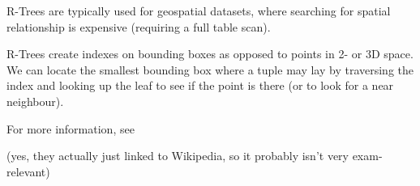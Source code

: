 R-Trees are typically used for geospatial datasets, where searching for spatial relationship is expensive (requiring a full table scan).

R-Trees create indexes on bounding boxes as opposed to points in 2- or 3D space.
We can locate the smallest bounding box where a tuple may lay by traversing the index and looking up the leaf to see if the point is there (or to look for a near neighbour).

For more information, see 

{\scriptsize (yes, they actually just linked to Wikipedia, so it probably isn't very exam-relevant)}
